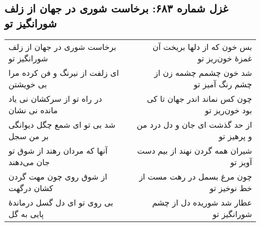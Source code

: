 \begin{center}
\section*{غزل شماره ۶۸۳: برخاست شوری در جهان از زلف شورانگیز تو}
\label{sec:683}
\begin{longtable}{l p{0.5cm} r}
برخاست شوری در جهان از زلف شورانگیز تو
&&
بس خون که از دلها بریخت آن غمزهٔ خون‌ریز تو
\\
ای زلفت از نیرنگ و فن کرده مرا بی خویشتن
&&
شد خون چشمم چشمه زن از چشم رنگ آمیز تو
\\
در راه تو از سرکشان نی یاد مانده نی نشان
&&
چون کس نماند اندر جهان تا کی بود خون‌ریز تو
\\
شد بی تو ای شمع چگل دیوانگی بر من سجل
&&
از حد گذشت ای جان و دل درد من و پرهیز تو
\\
آنها که مردان رهند از شوق تو جان می‌دهند
&&
شیران همه گردن نهند از بیم دست آویز تو
\\
از شوق روی چون مهت گردن کشان درگهت
&&
چون مرغ بسمل در رهت مست از خط نوخیز تو
\\
بی روی تو ای دل گسل درماندهٔ پایی به گل
&&
عطار شد شوریده دل از چشم شورانگیز تو
\\
\end{longtable}
\end{center}
